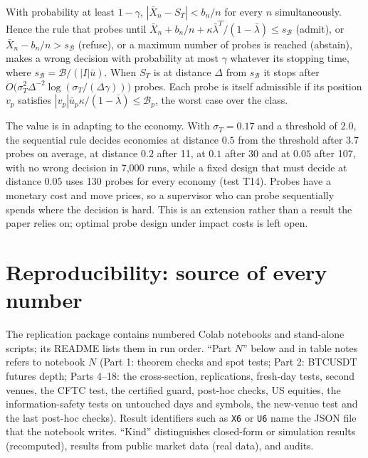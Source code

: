 \begin{proposition}\label{prop:probe}
With probability at least $1-\gamma$, $|\bar X_n-S_T|<b_n/n$ for every $n$ simultaneously. Hence the rule that probes until $\bar X_n+b_n/n+\kappa\bar\lambda^T/(1-\bar\lambda)\le s_{\mathcal B}$ (admit), or $\bar X_n-b_n/n>s_{\mathcal B}$ (refuse), or a maximum number of probes is reached (abstain), makes a wrong decision with probability at most $\gamma$ whatever its stopping time, where $s_{\mathcal B}=\mathcal B/(|I|\bar u)$. When $S_T$ is at distance $\Delta$ from $s_{\mathcal B}$ it stops after $O\bigl(\sigma_T^2\Delta^{-2}\log(\sigma_T/(\Delta\gamma))\bigr)$ probes. Each probe is itself admissible if its position $v_p$ satisfies $|v_p|\bar u_p\kappa/(1-\bar\lambda)\le\mathcal B_p$, the worst case over the class.
\end{proposition}

The value is in adapting to the economy. With $\sigma_T=0.17$ and a threshold of $2.0$, the sequential rule decides economies at distance $0.5$ from the threshold after 3.7 probes on average, at distance $0.2$ after 11, at $0.1$ after 30 and at $0.05$ after 107, with no wrong decision in 7{,}000 runs, while a fixed design that must decide at distance $0.05$ uses 130 probes for every economy (test T14). Probes have a monetary cost and move prices, so a supervisor who can probe sequentially spends where the decision is hard. This is an extension rather than a result the paper relies on; optimal probe design under impact costs is left open.

\section{Reproducibility: source of every number}\label{app:repro}

The replication package contains numbered Colab notebooks and stand-alone scripts; its README lists them in run order. ``Part $N$'' below and in table notes refers to notebook $N$ (Part 1: theorem checks and spot tests; Part 2: BTCUSDT futures depth; Parts 4--18: the cross-section, replications, fresh-day tests, second venues, the CFTC test, the certified guard, post-hoc checks, US equities, the information-safety tests on untouched days and symbols, the new-venue test and the last post-hoc checks). Result identifiers such as \texttt{X6} or \texttt{U6} name the JSON file that the notebook writes. ``Kind'' distinguishes closed-form or simulation results (recomputed), results from public market data (real data), and audits.


